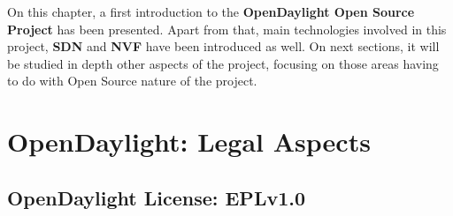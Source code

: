 \documentclass[a4paper, 12pt]{book}
\begin{document}
On this chapter, a first introduction to the \textbf{OpenDaylight Open Source Project} has been presented. Apart from that, main technologies involved in this project, \textbf{SDN} and \textbf{NVF} have been introduced as well. On next sections, it will be studied in depth other aspects of the project, focusing on those areas having to do with Open Source nature of the project.

\chapter{OpenDaylight: Legal Aspects}
\label{chap:odllegal}

\section{OpenDaylight License: EPLv1.0}
\label{sec:odllicense}
\end{document}
